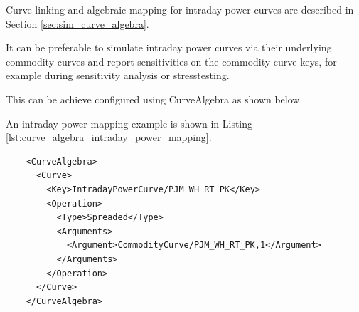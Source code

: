 Curve linking and algebraic mapping for intraday power curves are described in Section
\ref{sec:sim_curve_algebra}.

It can be preferable to simulate intraday power curves via their
underlying commodity curves and report sensitivities on the commodity curve keys, for example during sensitivity analysis or stresstesting.

This can be achieve configured using CurveAlgebra as shown below.

An intraday power mapping example is shown in Listing \ref{lst:curve_algebra_intraday_power_mapping}.

\begin{listing}
  \begin{verbatim}
    <CurveAlgebra>
      <Curve>
        <Key>IntradayPowerCurve/PJM_WH_RT_PK</Key>
        <Operation>
          <Type>Spreaded</Type>
          <Arguments>
            <Argument>CommodityCurve/PJM_WH_RT_PK,1</Argument>
          </Arguments>
        </Operation>
      </Curve>
    </CurveAlgebra>
  \end{verbatim}
\caption{CurveAlgebra node for intraday power to commodity mapping}
\label{lst:curve_algebra_intraday_power_mapping}
\end{listing}
